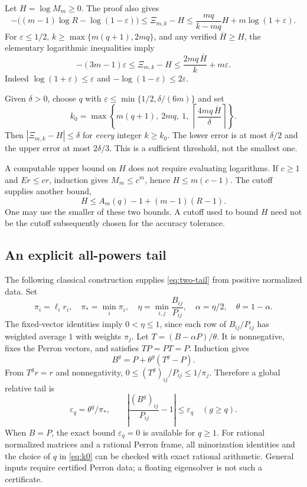 \documentclass[11pt,letterpaper]{article}
\theoremstyle{remark}
\begin{document}
Let $H=\log M_m\ge0$. The proof also gives
\begin{equation}\label{eq:error}
 -\bigl((m-1)\log R-\log(1-\varepsilon)\bigr)
 \le\Xi_{m,k}-H
 \le\frac{mq}{k-mq}H+m\log(1+\varepsilon).
\end{equation}
For $\varepsilon\le1/2$, $k\ge\max\{m(q+1),2mq\}$, and any verified
$\overline H\ge H$, the elementary logarithmic inequalities imply
\begin{equation}\label{eq:simple-error}
 -(3m-1)\varepsilon\le\Xi_{m,k}-H
       \le\frac{2mq\,\overline H}{k}+m\varepsilon.
\end{equation}
Indeed $\log(1+\varepsilon)\le\varepsilon$ and
$-\log(1-\varepsilon)\le2\varepsilon$.

Given $\delta>0$, choose $q$ with
$\varepsilon\le\min\{1/2,\delta/(6m)\}$ and set
\begin{equation}\label{eq:k0}
 k_0=\max\left\{m(q+1),\ 2mq,\ 1,\
                 \left\lceil\frac{4mq\,\overline H}{\delta}\right\rceil\right\}.
\end{equation}
Then $|\Xi_{m,k}-H|\le\delta$ for \emph{every} integer $k\ge k_0$.
The lower error is at most $\delta/2$ and the upper error at most
$2\delta/3$. This is a sufficient threshold, not the smallest one.

A computable upper bound on $H$ does not require evaluating logarithms.
If $c\ge1$ and $Er\le cr$, induction gives $M_m\le c^m$, hence
$H\le m(c-1)$. The cutoff supplies another bound,
\[
 H\le A_m(q)-1+(m-1)(R-1).
\]
One may use the smaller of these two bounds. A cutoff used to bound $H$
need not be the cutoff subsequently chosen for the accuracy tolerance.

\subsection{An explicit all-powers tail}

The following classical construction supplies \eqref{eq:two-tail} from
positive normalized data. Set
\[
 \pi_i=\ell_i r_i,\quad \pi_* =\min_i\pi_i,\quad
 \eta=\min_{i,j}\frac{B_{ij}}{P_{ij}},\quad
 \alpha=\eta/2,\quad \theta=1-\alpha.
\]
The fixed-vector identities imply $0<\eta\le1$, since each row of
$B_{ij}/P_{ij}$ has weighted average $1$ with weights $\pi_j$.
Let $T=(B-\alpha P)/\theta$. It is nonnegative, fixes the Perron vectors,
and satisfies $TP=PT=P$. Induction gives
\[
 B^g=P+\theta^g(T^g-P).
\]
From $T^gr=r$ and nonnegativity,
$0\le(T^g)_{ij}/P_{ij}\le1/\pi_j$. Therefore a global relative tail is
\begin{equation}\label{eq:explicit-tail}
 \varepsilon_q=\theta^q/\pi_*,\qquad
 \left|\frac{(B^g)_{ij}}{P_{ij}}-1\right|\le\varepsilon_q
                  \quad(g\ge q).
\end{equation}
When $B=P$, the exact bound $\varepsilon_q=0$ is available for $q\ge1$.
For rational normalized matrices and a rational Perron frame, all
minorization identities and the choice of $q$ in \eqref{eq:k0} can be
checked with exact rational arithmetic. General inputs require certified
Perron data; a floating eigensolver is not such a certificate.
\end{document}
